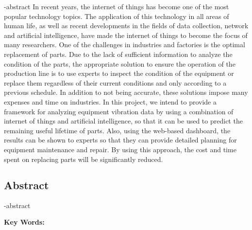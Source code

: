 
\en-abstract{
In recent years, the internet of things has become one of the most popular technology topics. The application of this technology in all areas of human life, as well as recent developments in the fields of data collection, network and artificial intelligence, have made the internet of things to become the focus of many researchers. One of the challenges in industries and factories is the optimal replacement of parts. Due to the lack of sufficient information to analyze the condition of the parts, the appropriate solution to ensure the operation of the production line is to use experts to inspect the condition of the equipment or replace them regardless of their current conditions and only according to a previous schedule. In addition to not being accurate, these solutions impose many expenses and time on industries. In this project, we intend to provide a framework for analyzing equipment vibration data by using a combination of internet of things and artificial intelligence, so that it can be used to predict the remaining useful lifetime of parts. Also, using the web-based dashboard, the results can be shown to experts so that they can provide detailed planning for equipment maintenance and repair. By using this approach, the cost and time spent on replacing parts will be significantly reduced.
}

\newpage
\thispagestyle{empty}
\begin{latin}
\section*{\LARGE\centering Abstract}

\een-abstract

\vspace*{.5cm}
{\large\textbf{Key Words:}}\par
\vspace*{.5cm}
\elatinkeywords
\end{latin}